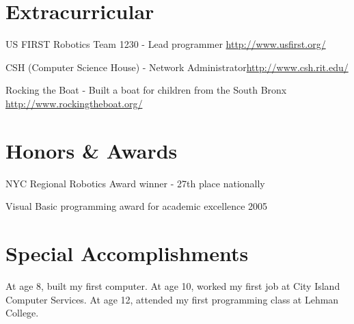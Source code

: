 \documentclass[a4paper,margin,line]{resume}
\newcommand{\rurl}[1]{\hfill {\footnotesize \url{#1}}}
\begin{document}
\begin{resume}
\section{\mysidestyle Extracurricular}
	\begin{asparablank}
		\item US FIRST Robotics Team 1230 - {\small Lead programmer}
		\rurl{http://www.usfirst.org/}
		\item CSH ({\small Computer Science House}) - Network Administrator\rurl{http://www.csh.rit.edu/}
		\item Rocking the Boat - {\small Built a boat for children from the South
		Bronx} \rurl{http://www.rockingtheboat.org/}
	\end{asparablank}

\section{\mysidestyle Honors \& Awards}
	\begin{asparablank}
		\item NYC Regional Robotics Award winner - {\small 27th place nationally}
		\item Visual Basic programming award for academic excellence 2005
	\end{asparablank}

\section{\mysidestyle Special Accomplishments}
	\begin{asparablank}
		\item At age 8, built my first computer. At age 10, worked my first job at City Island Computer Services. At age 12, attended my first programming class at Lehman College.
	\end{asparablank}

\end{resume}
\end{document}
